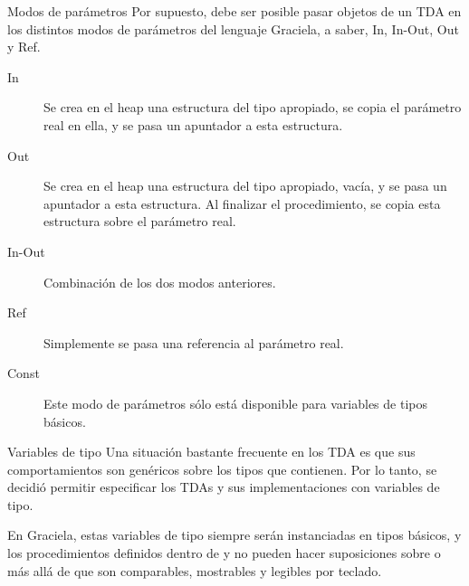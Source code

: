 \begin{frame}{Modos de parámetros}
Por supuesto, debe ser posible pasar objetos de un TDA en los distintos modos de parámetros del lenguaje Graciela, a saber, In, In-Out, Out y Ref.

\begin{description}
  \item [In]     Se crea en el heap una estructura del tipo apropiado, se copia el parámetro real en ella, y se pasa un apuntador a esta estructura.
  \item [Out]    Se crea en el heap una estructura del tipo apropiado, vacía, y se pasa un apuntador a esta estructura. Al finalizar el procedimiento, se copia esta estructura sobre el parámetro real.
  \item [In-Out] Combinación de los dos modos anteriores. 
  \item [Ref]    Simplemente se pasa una referencia al parámetro real.
  \item [Const]  Este modo de parámetros sólo está disponible para variables de tipos básicos. 
\end{description}

\end{frame}


\begin{frame}{Variables de tipo}
Una situación bastante frecuente en los TDA es que sus comportamientos son genéricos sobre los tipos que contienen. Por lo tanto, se decidió permitir
especificar los TDAs y sus implementaciones con variables de tipo. 

\typevar

En Graciela, estas variables de tipo siempre serán instanciadas en tipos básicos, y los procedimientos definidos dentro de  y  no pueden hacer suposiciones sobre  o  más allá de que son comparables, mostrables y legibles por teclado. 
\end{frame}



